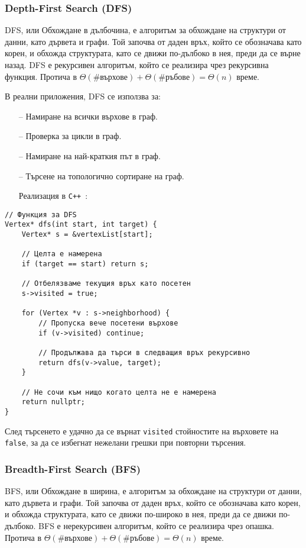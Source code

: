 \documentclass[oneside]{book}
\newcommand*{\code}[1]{\texttt{#1}}
\newcommand*{\cpp}{\texttt{C++}\ }
\begin{document}
\subsubsection{Depth-First Search (DFS)}
DFS, или Обхождане в дълбочина, е алгоритъм за обхождане на структури от данни, като дървета и графи.
Той започва от даден връх, който се обозначава като корен, и обхожда структурата, като се движи по-дълбоко в нея, преди да се върне назад.
DFS е рекурсивен алгоритъм, който се реализира чрез рекурсивна функция.
Протича в $\Theta(\# \text{върхове}) + \Theta(\# \text{ръбове}) = \Theta(n)$ време.

В реални приложения, DFS се използва за:
\begin{itemize}
    \item[--] Намиране на всички върхове в граф.
    \item[--] Проверка за цикли в граф.
    \item[--] Намиране на най-краткия път в граф.
    \item[--] Търсене на топологично сортиране на граф.
\end{itemize}

\begin{itemize}\item[Реализация] в \cpp:\end{itemize}
\begin{mdframed}\begin{lstlisting}[firstnumber=35]
// Функция за DFS
Vertex* dfs(int start, int target) {
    Vertex* s = &vertexList[start];

    // Целта е намерена
    if (target == start) return s;

    // Отбелязваме текущия връх като посетен
    s->visited = true;

    for (Vertex *v : s->neighborhood) {
        // Пропуска вече посетени върхове
        if (v->visited) continue;

        // Продължава да търси в следващия връх рекурсивно
        return dfs(v->value, target);
    }

    // Не сочи към нищо когато целта не е намерена
    return nullptr;
}
\end{lstlisting}\end{mdframed}

След търсенето е удачно да се върнат \code{visited} стойностите на върховете на \code{false}, за да се избегнат нежелани грешки при повторни търсения.

\subsubsection{Breadth-First Search (BFS)}
BFS, или Обхождане в ширина, е алгоритъм за обхождане на структури от данни, като дървета и графи.
Той започва от даден връх, който се обозначава като корен, и обхожда структурата, като се движи по-широко в нея, преди да се движи по-дълбоко.
BFS е нерекурсивен алгоритъм, който се реализира чрез опашка. Протича в $\Theta(\# \text{върхове}) + \Theta(\# \text{ръбове}) = \Theta(n)$ време.
\end{document}
